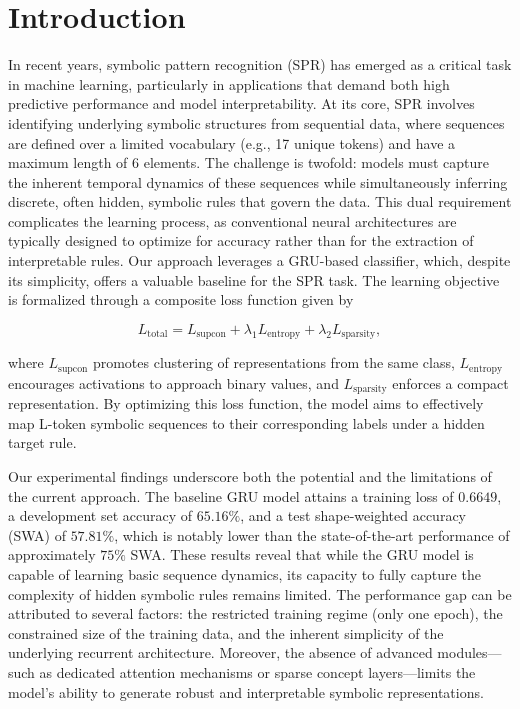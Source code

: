 \documentclass[12pt]{article}
\begin{document}
\section{Introduction}
In recent years, symbolic pattern recognition (SPR) has emerged as a critical task in machine learning, particularly in applications that demand both high predictive performance and model interpretability. At its core, SPR involves identifying underlying symbolic structures from sequential data, where sequences are defined over a limited vocabulary (e.g., 17 unique tokens) and have a maximum length of 6 elements. The challenge is twofold: models must capture the inherent temporal dynamics of these sequences while simultaneously inferring discrete, often hidden, symbolic rules that govern the data. This dual requirement complicates the learning process, as conventional neural architectures are typically designed to optimize for accuracy rather than for the extraction of interpretable rules. Our approach leverages a GRU-based classifier, which, despite its simplicity, offers a valuable baseline for the SPR task. The learning objective is formalized through a composite loss function given by

\[
L_{\text{total}} = L_{\text{supcon}} + \lambda_1 L_{\text{entropy}} + \lambda_2 L_{\text{sparsity}},
\]

where \(L_{\text{supcon}}\) promotes clustering of representations from the same class, \(L_{\text{entropy}}\) encourages activations to approach binary values, and \(L_{\text{sparsity}}\) enforces a compact representation. By optimizing this loss function, the model aims to effectively map L-token symbolic sequences to their corresponding labels under a hidden target rule.

Our experimental findings underscore both the potential and the limitations of the current approach. The baseline GRU model attains a training loss of \(0.6649\), a development set accuracy of \(65.16\%\), and a test shape-weighted accuracy (SWA) of \(57.81\%\), which is notably lower than the state-of-the-art performance of approximately \(75\%\) SWA. These results reveal that while the GRU model is capable of learning basic sequence dynamics, its capacity to fully capture the complexity of hidden symbolic rules remains limited. The performance gap can be attributed to several factors: the restricted training regime (only one epoch), the constrained size of the training data, and the inherent simplicity of the underlying recurrent architecture. Moreover, the absence of advanced modules—such as dedicated attention mechanisms or sparse concept layers—limits the model's ability to generate robust and interpretable symbolic representations.
\end{document}
